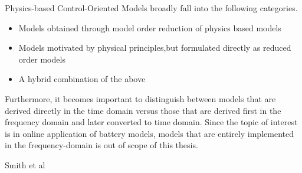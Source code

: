 Physics-based Control-Oriented Models broadly fall into the following categories.

\begin{itemize}
    \item Models obtained through model order reduction of physics based models
    \item Models motivated by physical principles,but formulated directly as reduced order models
    \item A hybrid combination of the above
\end{itemize}

Furthermore, it becomes important to distinguish between models that are derived directly in the time domain versus
those that are derived first in the frequency domain and later converted to time domain. Since the
topic of interest is in online application of battery models, models that are entirely implemented
in the frequency-domain is out of scope of this thesis.

Smith et al \cite{Smith2007}










